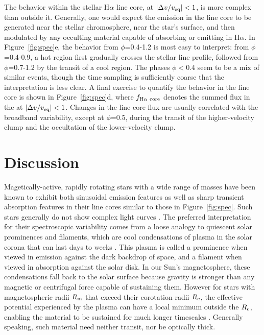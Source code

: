 \documentclass{nature3}
\begin{document}
The behavior within the stellar H$\alpha$ line core, at $|\Delta v /
v_{\rm eq}|<1$, is more complex than outside it.  Generally, one would
expect the emission in the line core to be generated near the stellar
chromosphere, near the star's surface, and then modulated by any
occulting material capable of absorbing or emitting in H$\alpha$.  In
Figure~\ref{fig:spec}e, the behavior from $\phi$=0.4-1.2 is most
easy to interpret: from $\phi$=0.4-0.9, a hot region first gradually
crosses the stellar line profile, followed from $\phi$=0.7-1.2 by the
transit of a cool region.  The phases $\phi$$<$0.4 seem to be a mix of
similar events, though the time sampling is sufficiently coarse that
the interpretation is less clear.  A final exercise to quantify the
behavior in the line core is shown in Figure~\ref{fig:spec}d, where
$f_{\rm H\alpha\ core}$ denotes the summed flux in the at $|\Delta v /
v_{\rm eq}|<1$.  Changes in the line core flux are usually correlated
with the broadband variability, except at $\phi$=0.5, during the
transit of the higher-velocity clump and the occultation of the
lower-velocity clump.


\section{Discussion}

Magetically-active, rapidly rotating stars with a wide range of masses
have been known to exhibit both sinusoidal emission features
\cite{Donati2000,Townsend2005,Dunstone2006,Skelly2008} as well as
sharp transient absorption features in their line cores
\cite{CollierCameron1989,CollierCameron1992,Cang2020} similar to those
in Figure~\ref{fig:spec}.  Such stars generally do not show complex
light curves \cite{Bouma2024}.  The preferred interpretation for their
spectroscopic variability comes from a loose analogy to quiescent
solar prominences and filaments, which are cool condensations of
plasma in the solar corona that can last days to weeks
\cite{VialEngvold2015}.  This plasma is called a prominence when
viewed in emission against the dark backdrop of space, and a filament
when viewed in absorption against the solar disk.  In our Sun's
magnetosphere, these condensations fall back to the solar surface
because gravity is stronger than any magnetic or centrifugal force
capable of sustaining them.  However for stars with magnetospheric
radii $R_{\rm m}$ that exceed their corotation radii $R_{\rm c}$, the
effective potential experienced by the plasma can have a local minimum
outside the $R_{\rm c}$, enabling the material to be sustained for
much longer timescales \cite{Petit2013,Daley-Yates2024}.
Generally speaking, such material need neither transit, nor be
optically thick.
\end{document}
